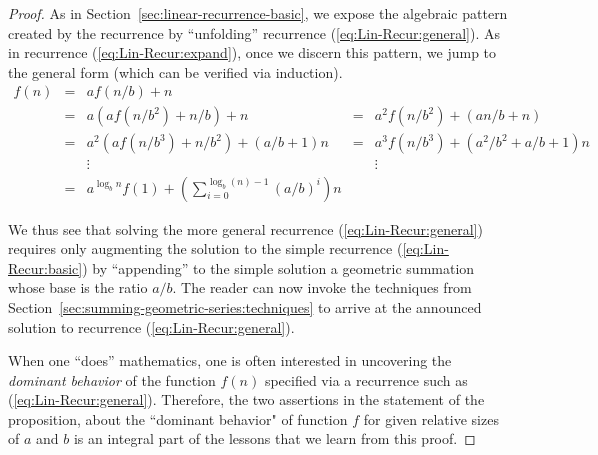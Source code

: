 \begin{proof}
As in Section~\ref{sec:linear-recurrence-basic}, we expose the algebraic pattern created by the recurrence by ``unfolding'' recurrence (\ref{eq:Lin-Recur:general}).  As in recurrence (\ref{eq:Lin-Recur:expand}), once we discern this pattern, we jump to the general form (which can be verified via induction).
\[
\begin{array}{ccccc}
f(n) & = & a f(n/b) + n & & \\
     & = & a \left( a f(n/b^2) + n/b \right) + n
             & = & a^2 f(n/b^2) + (an/b+n) \\
     & = & a^2 \left( a f(n/b^3) + n/b^2 \right) + (a/b+1)n
             & = & a^3 f(n/b^3) + (a^2/b^2+a/b+1)n \\
     &   & \vdots & & \vdots \\
    & = & 
{\displaystyle
a^{\log_b n} f(1) + \left( \sum_{i=0}^{\log_b (n)-1} (a/b)^i \right) n
} & &
\end{array}
\]

\smallskip

We thus see that solving the more general recurrence
(\ref{eq:Lin-Recur:general}) requires only augmenting the solution to
the simple recurrence (\ref{eq:Lin-Recur:basic}) by ``appending'' to
the simple solution a geometric summation whose base is the ratio
$a/b$.  The reader can now invoke the techniques from
Section~\ref{sec:summing-geometric-series:techniques} to arrive at the
announced solution to recurrence (\ref{eq:Lin-Recur:general}).

\medskip

When one ``does'' mathematics, one is often interested in uncovering the {\em dominant behavior} of the function $f(n)$ specified via a recurrence such as (\ref{eq:Lin-Recur:general}).  Therefore, the two assertions in the statement of the proposition, about the ``dominant behavior" of function $f$ for given relative sizes of $a$ and $b$ is an integral part of the lessons that we learn from this proof.

\medskip


\end{proof}
